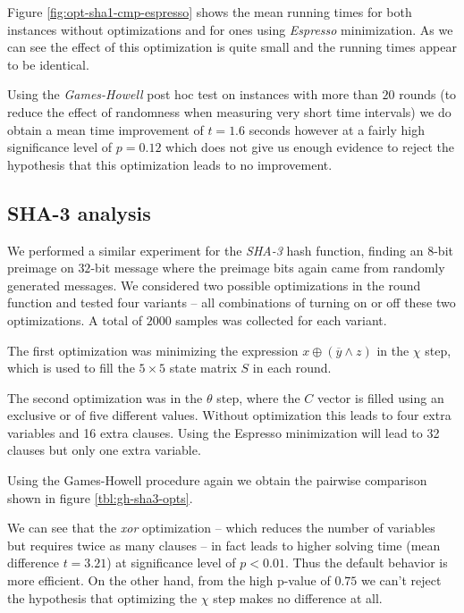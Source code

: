 Figure \ref{fig:opt-sha1-cmp-espresso} shows the mean running times for both instances without optimizations and for ones using \emph{Espresso} minimization.
As we can see the effect of this optimization is quite small and the running times appear to be identical.

%

Using the \emph{Games-Howell} post hoc test \cite{games1976pairwise} on instances with more than $20$ rounds (to reduce the effect of randomness when measuring very short time intervals) we do obtain a mean time improvement of $t=1.6$ seconds however at a fairly high significance level of $p=0.12$ which does not give us enough evidence to reject the hypothesis that this optimization leads to no improvement.

\subsection{SHA-3 analysis} 
\label{sec:sha3-espresso}
We performed a similar experiment for the \emph{SHA-3} hash function, finding an $8$-bit preimage on $32$-bit message where the preimage bits again came from randomly generated messages.
We considered two possible optimizations in the round function and tested four variants -- all combinations of turning on or off these two optimizations.
A total of $2000$ samples was collected for each variant.

The first optimization was minimizing the expression $x \oplus (\overline{y} \land z)$ in the $\chi$ step, which is used to fill the $5\times 5$ state matrix $S$ in each round.

The second optimization was in the $\theta$ step, where the $C$ vector is filled using an exclusive or of five different values.
Without optimization this leads to four extra variables and 16 extra clauses.
Using the Espresso minimization will lead to 32 clauses but only one extra variable.

Using the Games-Howell procedure again we obtain the pairwise comparison shown in figure \ref{tbl:gh-sha3-opts}.

We can see that the \emph{xor} optimization -- which reduces the number of variables but requires twice as many clauses -- in fact leads to higher solving time (mean difference $t=3.21$) at significance level of $p < 0.01$.
Thus the default behavior is more efficient.
On the other hand, from the high p-value of $0.75$ we can't reject the hypothesis that optimizing the $\chi$ step makes no difference at all.

